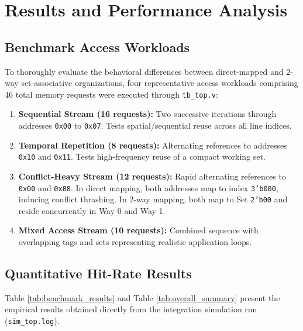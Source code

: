 \documentclass[10pt,twocolumn]{article}
\begin{document}
\section{Results and Performance Analysis}

\subsection{Benchmark Access Workloads}
To thoroughly evaluate the behavioral differences between direct-mapped and 2-way set-associative organizations, four representative access workloads comprising 46 total memory requests were executed through \texttt{tb\_top.v}:
\begin{enumerate}
    \item \textbf{Sequential Stream (16 requests):} Two successive iterations through addresses \texttt{0x00} to \texttt{0x07}. Tests spatial/sequential reuse across all line indices.
    \item \textbf{Temporal Repetition (8 requests):} Alternating references to addresses \texttt{0x10} and \texttt{0x11}. Tests high-frequency reuse of a compact working set.
    \item \textbf{Conflict-Heavy Stream (12 requests):} Rapid alternating references to \texttt{0x00} and \texttt{0x08}. In direct mapping, both addresses map to index \texttt{3'b000}, inducing conflict thrashing. In 2-way mapping, both map to Set \texttt{2'b00} and reside concurrently in Way 0 and Way 1.
    \item \textbf{Mixed Access Stream (10 requests):} Combined sequence with overlapping tags and sets representing realistic application loops.
\end{enumerate}

\subsection{Quantitative Hit-Rate Results}
Table \ref{tab:benchmark_results} and Table \ref{tab:overall_summary} present the empirical results obtained directly from the integration simulation run (\texttt{sim\_top.log}).

\begin{table}[htbp]
\centering
\caption{Workload Hit-Rate Comparison (46 Requests)}
\label{tab:benchmark_results}
\end{table}
\end{document}
